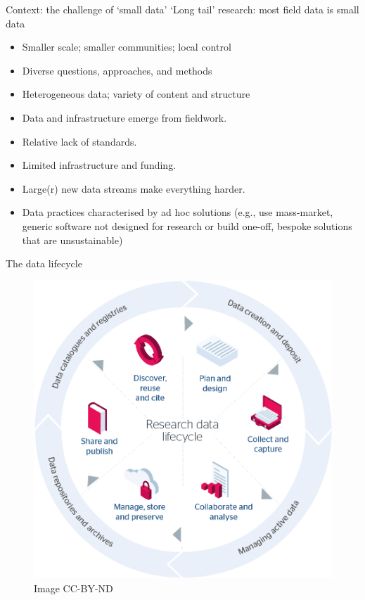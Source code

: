 \begin{frame}{Context: the challenge of `small data'}
    `Long tail' research: most field data is small data \parencite{Borgman2015-rh}
    \begin{itemize}
        \item Smaller scale; smaller communities; local control
        \item Diverse questions, approaches, and methods
        \item Heterogeneous data; variety of content and structure
        \item Data and infrastructure emerge from fieldwork. 
        \item Relative lack of standards.
        \item Limited infrastructure and funding.
        \item Large(r) new data streams make everything harder.
        \item Data practices characterised by ad hoc solutions (e.g., use mass-market, generic software not designed for research or build one-off, bespoke solutions that are unsustainable)
    \end{itemize}
\end{frame}



\begin{frame}{The data lifecycle}
 \begin{figure}[H]
    \centering
    \vspace{-0.5cm}
        \includegraphics[height=.75\textheight]{figures/research-data-life-diagram.png}
        \caption{\cite{Jisc2018-gx} Image CC-BY-ND}
        \label{fig:figure9}
 \end{figure}
\end{frame}

